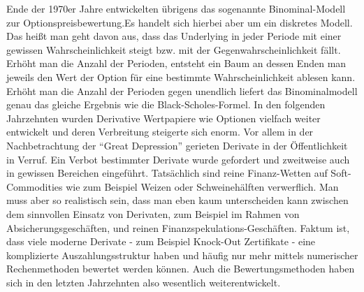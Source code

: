 Ende der 1970er Jahre entwickelten \textcite{Rubinstein1979} übrigens das sogenannte Binominal-Modell zur Optionspreisbewertung.Es handelt sich hierbei aber um ein diskretes Modell. Das heißt man geht davon aus, dass das Underlying in jeder Periode mit einer gewissen Wahrscheinlichkeit steigt bzw. mit der Gegenwahrscheinlichkeit fällt. Erhöht man die Anzahl der Perioden, entsteht ein Baum an dessen Enden man jeweils den Wert der Option für eine bestimmte Wahrscheinlichkeit ablesen kann. Erhöht man die Anzahl der Perioden gegen unendlich liefert das Binominalmodell genau das gleiche Ergebnis wie die Black-Scholes-Formel. In den folgenden Jahrzehnten wurden Derivative Wertpapiere wie Optionen vielfach weiter entwickelt und deren Verbreitung steigerte sich enorm. Vor allem in der Nachbetrachtung der "`Great Depression"' gerieten Derivate in der Öffentlichkeit in Verruf. Ein Verbot bestimmter Derivate wurde gefordert und zweitweise auch in gewissen Bereichen eingeführt. Tatsächlich sind reine Finanz-Wetten auf Soft-Commodities wie zum Beispiel Weizen oder Schweinehälften verwerflich. Man muss aber so realistisch sein, dass man eben kaum unterscheiden kann zwischen dem sinnvollen Einsatz von Derivaten, zum Beispiel im Rahmen von Absicherungsgeschäften, und reinen Finanzspekulations-Geschäften. Faktum ist, dass viele moderne Derivate - zum Beispiel Knock-Out Zertifikate - eine komplizierte Auszahlungsstruktur haben und häufig nur mehr mittels numerischer Rechenmethoden bewertet werden können. Auch die Bewertungsmethoden haben sich in den letzten Jahrzehnten also wesentlich weiterentwickelt.

